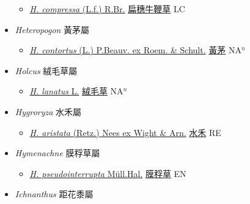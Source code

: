 \begin{itemize}
  \begin{itemize}
        \item[] \href{http://www.theplantlist.org/tpl1.1/search?q=Hemarthria+compressa}{\textit{H. compressa} (L.f.) R.Br.}   \href{\detokenize{http://taibnet.sinica.edu.tw/chi/taibnet_species_list.php?T2=扁穗牛鞭草&T2_new_value=true&fr=y}}{扁穗牛鞭草} LC
  \end{itemize}
 \item[] \textit{Heteropogon} 黃茅屬
                    
  \begin{itemize}
        \item[] \href{http://www.theplantlist.org/tpl1.1/search?q=Heteropogon+contortus}{\textit{H. contortus} (L.) P.Beauv. ex Roem. \& Schult.}   \href{\detokenize{http://taibnet.sinica.edu.tw/chi/taibnet_species_list.php?T2=黃茅&T2_new_value=true&fr=y}}{黃茅} NA$^n$
  \end{itemize}
 \item[] \textit{Holcus} 絨毛草屬
                    
  \begin{itemize}
        \item[] \href{http://www.theplantlist.org/tpl1.1/search?q=Holcus+lanatus}{\textit{H. lanatus} L.}   \href{\detokenize{http://taibnet.sinica.edu.tw/chi/taibnet_species_list.php?T2=絨毛草&T2_new_value=true&fr=y}}{絨毛草} NA$^n$
  \end{itemize}
 \item[] \textit{Hygroryza} 水禾屬
                    
  \begin{itemize}
        \item[] \href{http://www.theplantlist.org/tpl1.1/search?q=Hygroryza+aristata}{\textit{H. aristata} (Retz.) Nees ex Wight \& Arn.}   \href{\detokenize{http://taibnet.sinica.edu.tw/chi/taibnet_species_list.php?T2=水禾&T2_new_value=true&fr=y}}{水禾} RE
  \end{itemize}
 \item[] \textit{Hymenachne} 膜稃草屬
                    
  \begin{itemize}
        \item[] \href{http://www.theplantlist.org/tpl1.1/search?q=Hymenachne+pseudointerrupta}{\textit{H. pseudointerrupta} Müll.Hal.}   \href{\detokenize{http://taibnet.sinica.edu.tw/chi/taibnet_species_list.php?T2=膜稃草&T2_new_value=true&fr=y}}{膜稃草} EN
  \end{itemize}
 \item[] \textit{Ichnanthus} 距花黍屬
                    

\end{itemize}
